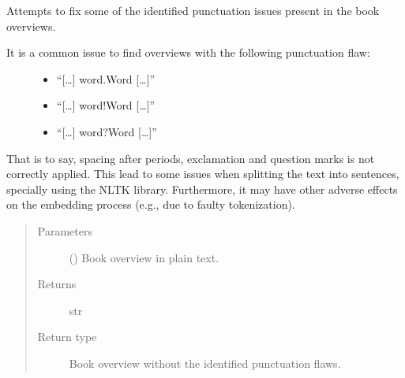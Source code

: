 \documentclass[letterpaper,10pt,english]{sphinxmanual}
\begin{document}
\begin{fulllineitems}
\label{\detokenize{code:code_utils.utils.fix_punctuation}}
Attempts to fix some of the identified punctuation issues present in the 
book overviews.
\begin{description}
\item[{It is a common issue to find overviews with the following punctuation flaw:}] \leavevmode\begin{itemize}
\item {} 
“{[}…{]} word.Word {[}…{]}”

\item {} 
“{[}…{]} word!Word {[}…{]}”

\item {} 
“{[}…{]} word?Word {[}…{]}”

\end{itemize}

\end{description}

That is to say, spacing after periods, exclamation and question marks is not
correctly applied. This lead to some issues when splitting the text into sentences,
specially using the NLTK library. Furthermore, it may have other adverse effects
on the embedding process (e.g., due to faulty tokenization).
\begin{quote}\begin{description}
\item[{Parameters}] \leavevmode
{} () \textendash{} Book overview in plain text.

\item[{Returns}] \leavevmode
str

\item[{Return type}] \leavevmode
Book overview without the identified punctuation flaws.

\end{description}\end{quote}

\end{fulllineitems}

\end{document}
